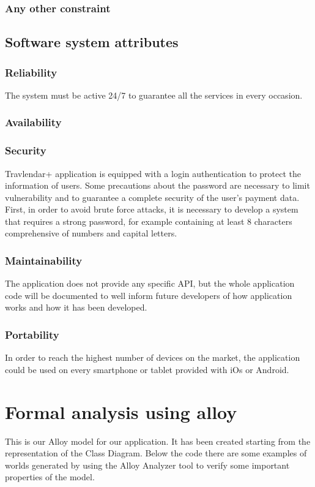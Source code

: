 \documentclass[12pt,titlepage]{article}
\begin{document}
\subsubsection{Any other constraint}\label{sec:mod1}
\subsection{Software system attributes}\label{sec:mod1}
\subsubsection{Reliability}\label{sec:mod1}
The system must be active 24/7 to guarantee all the services in every occasion. 

\subsubsection{Availability}\label{sec:mod1}
\subsubsection{Security}\label{sec:mod1}

Travlendar+ application is equipped with a login authentication to protect the information of users. Some precautions about the password are necessary to limit vulnerability and to guarantee a complete security of the user's payment data. First, in order to avoid brute force attacks, it is necessary to develop a system that requires a strong password, for example containing at least 8 characters comprehensive of numbers and capital letters.



\subsubsection{Maintainability}\label{sec:mod1}
The application does not provide any specific API, but the whole application code will be documented to well inform future developers of how application works and how it has been developed. 

\subsubsection{Portability}\label{sec:mod1}
In order to reach the highest number of devices on the market, the application could be used on every smartphone or tablet provided with iOs or Android. 
\pagebreak

\section{Formal analysis using alloy}\label{sec:crit}
This is our Alloy model for our application. It has been created starting from the representation of the Class Diagram. Below the code there are some examples of worlds generated by using the Alloy Analyzer tool to verify some important properties of the model. 
\end{document}
